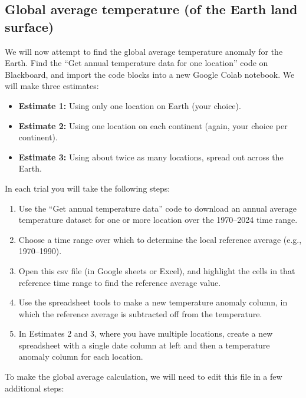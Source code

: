 \subsection{Global average temperature (of the Earth land surface)}

We will now attempt to find the global average temperature anomaly for the Earth.   Find the ``Get annual temperature data for one location'' code on Blackboard, and import the code blocks into a new Google Colab notebook.  We will make three estimates:
	\begin{itemize}
	\item {\bf Estimate 1:} Using only one location on Earth (your choice).
	\item {\bf Estimate 2:} Using one location on each continent (again, your choice per continent).
	\item {\bf Estimate 3:} Using about twice as many locations, spread out across the Earth.
	\end{itemize}
In each trial you will take the following steps:
	\begin{enumerate}
	\item Use the ``Get annual temperature data'' code to download an annual average temperature dataset for one or more location over the 1970--2024 time range.
	\item Choose a time range over which to determine the local reference average (e.g., 1970--1990).
	\item Open this csv file (in Google sheets or Excel), and highlight the cells in that reference time range to find the reference average value.
	\item Use the spreadsheet tools to make a new temperature anomaly column, in which the reference average is subtracted off from the temperature.
	\item In Estimates 2 and 3, where you have multiple locations, create a new spreadsheet with a single date column at left and then a temperature anomaly column for each location.
	\end{enumerate}
To make the global average calculation, we will need to edit this file in a few additional steps:
